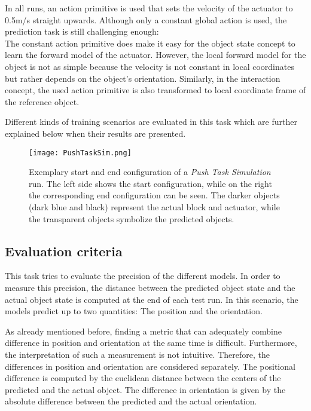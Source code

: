 In all runs, an action primitive is used that sets the velocity of the actuator to 0.5m/s straight upwards. Although only a constant global action is used, the prediction task is still challenging enough: \\
The constant action primitive does make it easy for the object state concept to learn the forward model of the actuator. However, the local forward model for the object is not as simple because the velocity is not constant in local coordinates but rather depends on the object's orientation. 
Similarly, in the interaction concept, the used action primitive is also transformed to local coordinate frame of the reference object.

Different kinds of training scenarios are evaluated in this task which are further explained below when their results are presented.


\begin{figure}
	\centering
	\texttt{[image: PushTaskSim.png]}
	\caption{Exemplary start and end configuration of a \textit{Push Task Simulation} run. The left side shows the start configuration, while on the right the corresponding end configuration can be seen.
		The darker objects (dark blue and black) represent the actual block and actuator, while the transparent objects symbolize the predicted objects.}
	\label{fig:pushTaskSim}
\end{figure}


\subsection{Evaluation criteria}

This task tries to evaluate the precision of the different models. In order to measure this precision, the distance between the predicted object state and the actual object state is computed at the end of each test run.
In this scenario, the models predict up to two quantities: The position and the orientation. 

As already mentioned before, finding a metric that can adequately combine difference in position and orientation at the same time is difficult. Furthermore, the interpretation of such a measurement is not intuitive. Therefore, the differences in position and orientation are considered separately. 
The positional difference is computed by the euclidean distance between the centers of the predicted and the actual object. The difference in orientation is given by the absolute difference between the predicted and the actual orientation.

